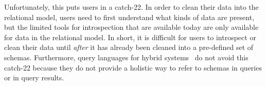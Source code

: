 

Unfortunately, this puts users in a catch-22. In order to clean their data into the relational model, users need to first understand what kinds of data are present, but the limited tools for introspection that are available today are only available for data in the relational model. In short, it is difficult for users to introspect or clean their data until {\em after} it has already been cleaned into a pre-defined set of schemas. Furthermore, query languages for hybrid systems~\cite{asterixdb, sql++, snowflake, partiql}
do not avoid this catch-22 because they do not provide a holistic way to refer to schemas in queries or in query results.